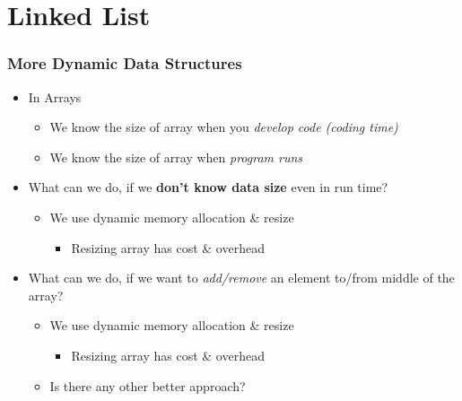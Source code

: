 \documentclass{../c-lecture}
\begin{document}
\section{Linked List}

\begin{frame}
  \frametitle{More Dynamic Data Structures}
  \begin{itemize}
    \item In Arrays
    \begin{itemize}
      \item
        We know the size of array when you
        \textit{\color{LimeGreen} develop code (coding time)}
      \item
        We know the size of array when
        \textit{\color{Cyan} program runs}
    \end{itemize}
    \item
      What can we do, if we
      \textbf{\color{YellowOrange} don’t know data size} even in run time?
    \begin{itemize}
      \item We use dynamic memory allocation \& resize
      \begin{itemize}
        \item Resizing array has cost \& overhead
      \end{itemize}
    \end{itemize}
  \end{itemize}
\end{frame}

\begin{frame}
  \begin{itemize}
    \item
      What can we do, if we want to
      \textit{\color{YellowOrange} add/remove} an element to/from middle of
      the array?

    \begin{itemize}
      \item We use dynamic memory allocation \& resize
      \begin{itemize}
        \item Resizing array has cost \& overhead
      \end{itemize}
      \item Is there any other better approach?
    \end{itemize}
  \end{itemize}
\end{frame}
\end{document}
